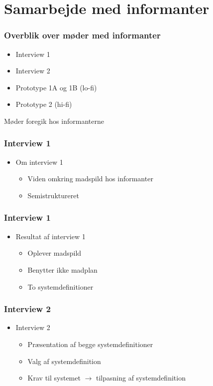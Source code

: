 \section{Samarbejde med informanter}

\begin{frame}
\frametitle{Overblik over møder med informanter}
	\begin{itemize}	
		\item Interview 1
		\item Interview 2
		\item Prototype 1A og 1B (lo-fi)
		\item Prototype 2 (hi-fi)
	\end{itemize}
		Møder foregik hos informanterne
\end{frame}

\begin{frame}
\frametitle{Interview 1}
	\begin{itemize}
	\item Om interview 1
			\begin{itemize}
			\item Viden omkring madspild hos informanter
			\item Semistruktureret
			\end{itemize}
	\end{itemize}
\end{frame}

\begin{frame}
\frametitle{Interview 1}
	\begin{itemize}
	\item Resultat af interview 1
			\begin{itemize}
				\item Oplever madspild
				\item Benytter ikke madplan
				\item To systemdefinitioner
			\end{itemize}	
	\end{itemize}
\end{frame}

\begin{frame}
\frametitle{Interview 2}
	\begin{itemize}
	\item Interview 2
			\begin{itemize}
			\item Præsentation af begge systemdefinitioner
			\item Valg af systemdefinition
			\item Krav til systemet $\rightarrow$ tilpasning af systemdefinition
			\end{itemize}
	\end{itemize}
\end{frame}


